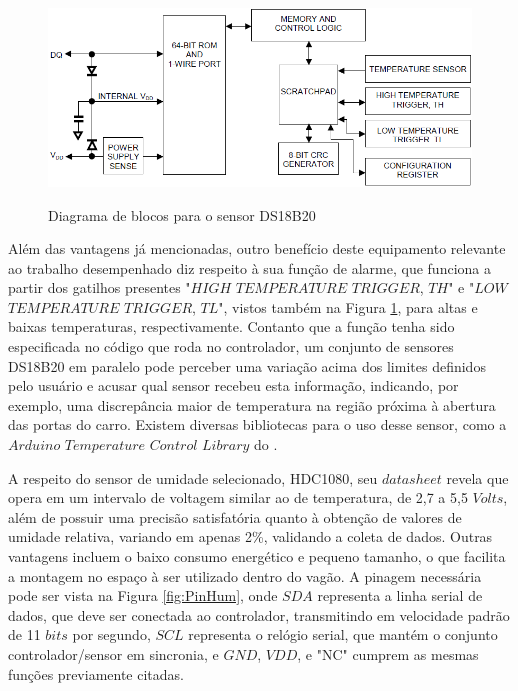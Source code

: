 \documentclass[acronym,symbols]{fei}
\begin{document}
\begin{figure}[!htb]
\centering
    \caption{Diagrama de blocos para o sensor DS18B20}
    \includegraphics[width=0.8\linewidth]{Imagens/DiagBlocTemp.png}
    \label{fig:DiagBlocTemp}
\end{figure}

Além das vantagens já mencionadas, outro benefício deste equipamento relevante ao trabalho desempenhado diz respeito à sua função de alarme, que funciona a partir dos gatilhos presentes "$HIGH$ $TEMPERATURE$ $TRIGGER$, $TH$" e "$LOW$ $TEMPERATURE$ $TRIGGER$, $TL$", vistos também na Figura \ref{fig:DiagBlocTemp}, para altas e baixas temperaturas, respectivamente. Contanto que a função tenha sido especificada no código que roda no controlador, um conjunto de sensores DS18B20 em paralelo pode perceber uma variação acima dos limites definidos pelo usuário e acusar qual sensor recebeu esta informação, indicando, por exemplo, uma discrepância maior de temperatura na região próxima à abertura das portas do carro. Existem diversas bibliotecas para o uso desse sensor, como a $Arduino$ $Temperature$ $Control$ $Library$ do \textcite{Arduino-Temperature-Control-Library}.

A respeito do sensor de umidade selecionado, HDC1080, seu $datasheet$ revela que opera em um intervalo de voltagem similar ao de temperatura, de 2,7 a 5,5 $Volts$, além de possuir uma precisão satisfatória quanto à obtenção de valores de umidade relativa, variando em apenas 2\%, validando a coleta de dados. Outras vantagens incluem o baixo consumo energético e pequeno tamanho, o que facilita a montagem no espaço à ser utilizado dentro do vagão. A pinagem necessária pode ser vista na Figura \ref{fig:PinHum}, onde $SDA$ representa a linha serial de dados, que deve ser conectada ao controlador, transmitindo em velocidade padrão de 11 $bits$ por segundo, $SCL$ representa o relógio serial, que mantém o conjunto controlador/sensor em sincronia, e $GND$, $VDD$, e "NC" cumprem as mesmas funções previamente citadas.
\end{document}

